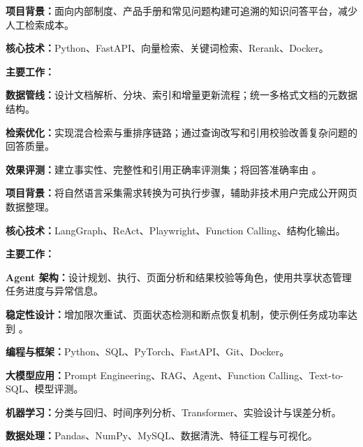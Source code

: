 \documentclass{simplecnresume}
\begin{document}
\begin{resumeitems}
  \item \textbf{项目背景：}面向内部制度、产品手册和常见问题构建可追溯的知识问答平台，减少人工检索成本。
  \item \textbf{核心技术：}Python、FastAPI、向量检索、关键词检索、Rerank、Docker。
  \item \textbf{主要工作：}
    \begin{resumedetails}
      \item \textbf{数据管线：}设计文档解析、分块、索引和增量更新流程；统一多格式文档的元数据结构。
      \item \textbf{检索优化：}实现混合检索与重排序链路；通过查询改写和引用校验改善复杂问题的回答质量。
      \item \textbf{效果评测：}建立事实性、完整性和引用正确率评测集；将回答准确率由 。
    \end{resumedetails}
\end{resumeitems}

\resumeprojectdivider
{}
\begin{resumeitems}
  \item \textbf{项目背景：}将自然语言采集需求转换为可执行步骤，辅助非技术用户完成公开网页数据整理。
  \item \textbf{核心技术：}LangGraph、ReAct、Playwright、Function Calling、结构化输出。
  \item \textbf{主要工作：}
    \begin{resumedetails}
      \item \textbf{Agent 架构：}设计规划、执行、页面分析和结果校验等角色，使用共享状态管理任务进度与异常信息。
      \item \textbf{稳定性设计：}增加限次重试、页面状态检测和断点恢复机制，使示例任务成功率达到 。
    \end{resumedetails}
\end{resumeitems}

\begin{resumeitems}
  \item \textbf{编程与框架：}Python、SQL、PyTorch、FastAPI、Git、Docker。
  \item \textbf{大模型应用：}Prompt Engineering、RAG、Agent、Function Calling、Text-to-SQL、模型评测。
  \item \textbf{机器学习：}分类与回归、时间序列分析、Transformer、实验设计与误差分析。
  \item \textbf{数据处理：}Pandas、NumPy、MySQL、数据清洗、特征工程与可视化。
\end{resumeitems}
\end{document}
